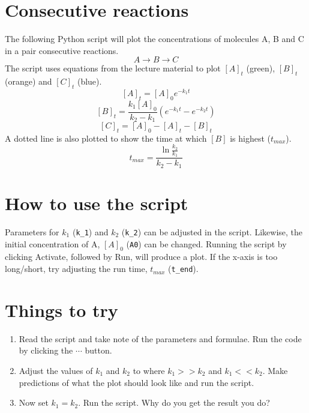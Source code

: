 \documentclass{article}
\begin{document}
\section{Consecutive reactions}

The following Python script will plot the concentrations of molecules A, B and C in a pair consecutive reactions.
$$A\longrightarrow B\longrightarrow C$$
The script uses equations from the lecture material to plot $[A]_t$ (green), $[B]_t$ (orange) and $[C]_t$ (blue).
\[[A]_t = [A]_0e^{-k_1t}\]
\[[B]_t = \frac{k_1[A]_0}{k_2-k_1}(e^{-k_1t}-e^{-k_2t})\]
\[[C]_t = [A]_0-[A]_t-[B]_t\]
A dotted line is also plotted to show the time at which $[B]$ is highest ($t_{max}$).
\[t_{max} = \frac{\ln \frac{k_2}{k_1}}{k_2-k_1}\]

\section{How to use the script}
Parameters for $k_1$ (\texttt{k\_1}) and $k_2$ (\texttt{k\_2}) can be adjusted in the script. Likewise, the initial concentration of A, $[A]_0$ (\texttt{A0}) can be changed. Running the script by clicking Activate, followed by Run, will produce a plot. If the x-axis is too long/short, try adjusting the run time, $t_{max}$ (\texttt{t\_end}).

\section{Things to try}
\begin{enumerate}
\item Read the script and take note of the parameters and formulae. Run the code by clicking the $\cdots$ button.
\item Adjust the values of $k_1$ and $k_2$ to where $k_1>>k_2$ and $k_1<<k_2$. Make predictions of what the plot should look like and run the script.
\item Now set $k_1=k_2$. Run the script. Why do you get the result you do?
\end{enumerate}
\end{document}
